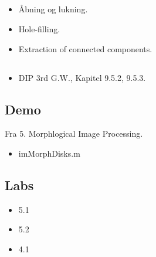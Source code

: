 \subsection{\subtopics}

\begin{itemize}
	\item Åbning og lukning.
	\item Hole-filling.
	\item Extraction of connected components.
\end{itemize}

\subsection{\curriculum}

\begin{itemize}
	\item DIP 3rd G.W., Kapitel 9.5.2, 9.5.3.
\end{itemize}

\subsection{Demo}

Fra 5. Morphlogical Image Processing.

\begin{itemize}
	\item imMorphDisks.m
\end{itemize}

\subsection{Labs}

\begin{itemize}
	\item 5.1
	\item 5.2
	\item 4.1
\end{itemize}